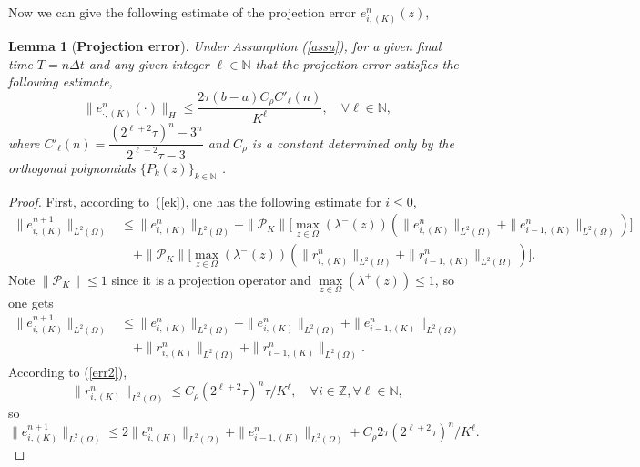 \documentclass[12pt]{article}
\theoremstyle{plain}
\newtheorem{lemma}{Lemma}[section]
\theoremstyle{remark}
\theoremstyle{remark}
\theoremstyle{remark}
\numberwithin{equation}{section}
\newcommand{\Z}{{\mathbb{Z}}}
\newcommand{\N}{{\mathbb{N}}}
\newcommand{\p}{\mathcal{P}}
\newcommand{\Dt}{\Delta t}
\begin{document}
Now we can give the following estimate of the projection error $e^n_{i,(K)}(z)$,
\begin{lemma}[{\bf Projection error}]\label{pr_e}
  Under Assumption (\ref{assu}),  for a given final time $T = n\Dt$ and any given integer $\ell\in\N$ that the projection error satisfies the following estimate,
  \begin{equation}
    \|e^n_{\cdot,(K)}(\cdot)\|_H \leq \frac{2\tau(b-a)C_\rho C'_\ell(n)}{K^\ell}, \quad \forall\ell\in\N,
  \end{equation}
  where $C'_{\ell}(n)= \dfrac{(2^{\ell+2}\tau)^n - 3^n}{2^{\ell+2}\tau - 3}$ and $C_\rho$ is a constant determined only by the orthogonal polynomials $\{P_k(z)\}_{k\in\N}$ .
\end{lemma}
\begin{proof}
  First, according to~(\ref{ek}), one has the following estimate for $i\leq 0$,
  \begin{equation}
    \begin{split}
      \|e^{n+1}_{i,(K)}\|_{L^2(\Omega)} & \leq \|e^n_{i,(K)}\|_{L^2(\Omega)} + \|\p_K\| \big[\max\limits_{z\in\Omega}(\lambda^-(z))(\|e^n_{i,(K)}\|_{L^2(\Omega)} + \|e^n_{i-1,(K)}\|_{L^2(\Omega)})\big] \\
      &\quad + \|\p_K\| \big[\max\limits_{z\in\Omega}(\lambda^-(z))(\|r^n_{i,(K)}\|_{L^2(\Omega)} + \|r^n_{i-1,(K)}\|_{L^2(\Omega)})\big].
    \end{split}
  \end{equation}
Note   $\|\p_K\|\leq 1$ since it is a projection operator and $\max\limits_{z\in\Omega}(\lambda^{\pm}(z))\leq 1$, so one gets
  \begin{equation}
    \begin{split}
      \|e^{n+1}_{i,(K)}\|_{L^2(\Omega)} & \leq \|e^n_{i,(K)}\|_{L^2(\Omega)} + \|e^n_{i,(K)}\|_{L^2(\Omega)} + \|e^n_{i-1,(K)}\|_{L^2(\Omega)} \\
      &\quad + \|r^n_{i,(K)}\|_{L^2(\Omega)} + \|r^n_{i-1,(K)}\|_{L^2(\Omega)}.
    \end{split}
  \end{equation}
  According to (\ref{err2}), 
  \begin{equation}
    \|r^n_{i,(K)}\|_{L^2(\Omega)}\leq C_\rho (2^{\ell+2}\tau)^n\tau/K^\ell, \quad\forall i\in\Z, \forall \ell\in\N,
  \end{equation}
  so
  \begin{equation}
    \|e^{n+1}_{i,(K)}\|_{L^2(\Omega)} \leq 2\|e^n_{i,(K)}\|_{L^2(\Omega)} + \|e^n_{i-1,(K)}\|_{L^2(\Omega)} + C_\rho 2\tau(2^{\ell+2}\tau)^n/K^\ell.
  \end{equation}


\end{proof}
\end{document}
